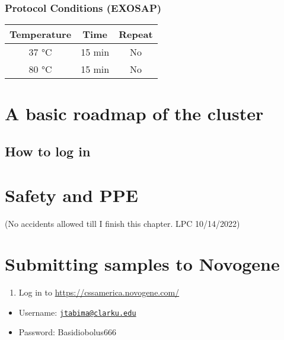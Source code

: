 \documentclass[
]{book}
\providecommand{\tightlist}{%
  \setlength{\itemsep}{0pt}\setlength{\parskip}{0pt}}
\begin{document}
\hypertarget{protocol-conditions-exosap}{%
\subsection{Protocol Conditions (EXOSAP)}\label{protocol-conditions-exosap}}

\begin{longtable}[]{@{}ccc@{}}
\toprule
Temperature & Time & Repeat \\
\midrule
\endhead
37 °C & 15 min & No \\
80 °C & 15 min & No \\
\bottomrule
\end{longtable}

\hypertarget{a-basic-roadmap-of-the-cluster}{%
\chapter{A basic roadmap of the cluster}\label{a-basic-roadmap-of-the-cluster}}

\hypertarget{how-to-log-in}{%
\section{How to log in}\label{how-to-log-in}}

\hypertarget{safety-and-ppe}{%
\chapter{Safety and PPE}\label{safety-and-ppe}}

(No accidents allowed till I finish this chapter. LPC 10/14/2022)

\hypertarget{submitting-samples-to-novogene}{%
\chapter{Submitting samples to Novogene}\label{submitting-samples-to-novogene}}

\begin{enumerate}
\def\labelenumi{\arabic{enumi}.}
\tightlist
\item
  Log in to \url{https://cssamerica.novogene.com/}
\end{enumerate}

\begin{itemize}
\tightlist
\item
  Username: \href{mailto:jtabima@clarku.edu}{\nolinkurl{jtabima@clarku.edu}}
\item
  Password: Basidiobolus666
\end{itemize}
\end{document}
